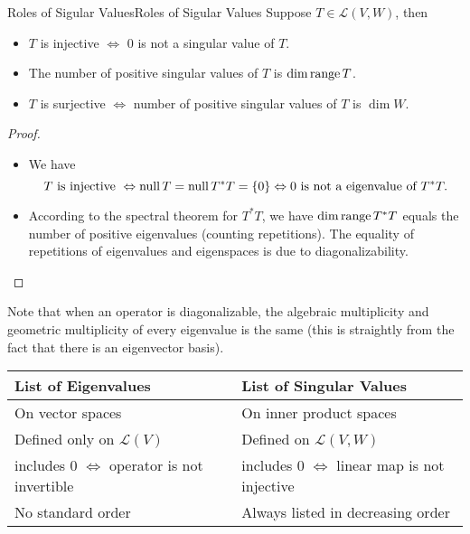 \documentclass[../main.tex]{subfiles}
\begin{document}
\begin{theorem}{Roles of Sigular Values}{Roles of Sigular Values}
Suppose $T\in \mathscr{L}(V,W)$, then
\begin{itemize}
\item $T$ is injective $\Leftrightarrow $ $0$ is not a singular value of $T$.
\item The number of positive singular values of $T$ is $\dim \operatorname{range} T$.
\item $T$ is surjective $\Leftrightarrow $ number of positive singular values of $T$ is $\dim W$.
\end{itemize}
\end{theorem}
\begin{proof}
\begin{itemize}
\item We have
	\begin{equation*}
	T \text{ is injective } \Leftrightarrow \operatorname{null} T = \operatorname{null} T^*T =\left\{ 0 \right\} \Leftrightarrow 0 \text{ is not a eigenvalue of } T^*T.
	\end{equation*}
\item According to the spectral theorem for $T^*T$, we have $\dim \operatorname{range} T^*T$ equals the number of positive eigenvalues (counting repetitions). The equality of repetitions of eigenvalues and eigenspaces is due to diagonalizability.
\end{itemize}
\end{proof}

\begin{remark}
Note that when an operator is diagonalizable, the algebraic multiplicity and geometric multiplicity of every eigenvalue is the same (this is straightly from the fact that there is an eigenvector basis).
\end{remark}

\begin{table}[H]
\centering
\begin{tabular}{|l|l|}
\hline
List of Eigenvalues & List of Singular Values \\ \hline
On vector spaces    & On inner product spaces \\ \hline
Defined only on $\mathscr{L}(V)$  & Defined on $\mathscr{L}(V,W)$ \\ \hline
includes 0 $\Leftrightarrow $ operator is not invertible& includes 0 $\Leftrightarrow $ linear map is not injective   \\ \hline
No standard order & Always listed in decreasing order\\
\hline
\end{tabular}
\end{table}
\end{document}
